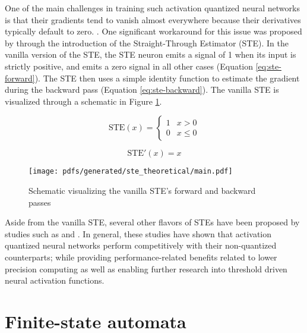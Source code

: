 One of the main challenges in training such activation quantized neural networks is that their gradients tend to vanish almost everywhere because their derivatives typically default to zero. \citep{bengio2013estimating,courbariaux2016binarized,yin2019understanding}. One significant workaround for this issue was proposed by \citet{bengio2013estimating} through the introduction of the Straight-Through Estimator (STE). In the vanilla version of the STE, the STE neuron emits a signal of 1 when its input is strictly positive, and emits a zero signal in all other cases (Equation \ref{eq:ste-forward}). The STE then uses a simple identity function to estimate the gradient during the backward pass (Equation \ref{eq:ste-backward}). The vanilla STE is visualized through a schematic in Figure \ref{fig:straight-through-estimator}.

\begin{equation}
  \label{eq:ste-forward}
  \text{STE}(x)=
  \begin{cases}
    1 & x > 0 \\
    0 & x \leq 0
  \end{cases}
\end{equation}

\begin{equation}
  \label{eq:ste-backward}
  \text{STE}'(x)= x
\end{equation}

\begin{figure}[t]
  \centering
  \texttt{[image: pdfs/generated/ste\_theoretical/main.pdf]}
  \caption{Schematic visualizing the vanilla STE's forward and backward passes}
  \label{fig:straight-through-estimator}
\end{figure}

Aside from the vanilla STE, several other flavors of STEs have been proposed by studies such as \citet{courbariaux2016binarized} and \citet{yin2019understanding}. In general, these studies have shown that activation quantized neural networks perform competitively with their non-quantized counterparts; while providing performance-related benefits related to lower precision computing as well as enabling further research into threshold driven neural activation functions.

\section{Finite-state automata}

\label{section:fsa}

